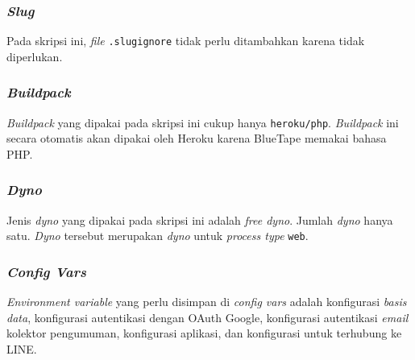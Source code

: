 	\subsubsection{\textit{Slug}}
		Pada skripsi ini, \textit{file} \texttt{.slugignore} tidak perlu ditambahkan karena tidak diperlukan.
		
	\subsubsection{\textit{Buildpack}}
	\textit{Buildpack} yang dipakai pada skripsi ini cukup hanya \texttt{heroku/php}. \textit{Buildpack} ini secara otomatis akan dipakai oleh Heroku karena BlueTape memakai bahasa PHP.
		
	\subsubsection{\textit{Dyno}}
		Jenis \textit{dyno} yang dipakai pada skripsi ini adalah \textit{free dyno}. Jumlah \textit{dyno} hanya satu. \textit{Dyno} tersebut merupakan \textit{dyno} untuk \textit{process type} \texttt{web}.
		
	\subsubsection{\textit{Config Vars}}
		\textit{Environment variable} yang perlu disimpan di \textit{config vars} adalah konfigurasi \textit{basis data}, konfigurasi autentikasi dengan OAuth Google, konfigurasi autentikasi \textit{email} kolektor pengumuman, konfigurasi aplikasi, dan konfigurasi untuk terhubung ke LINE.
		
